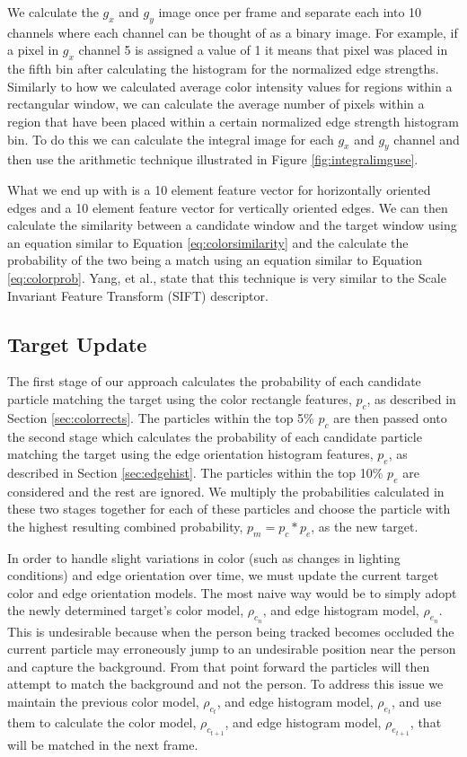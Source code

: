 \documentclass[11pt]{article}
\begin{document}
We calculate the $g_x$ and $g_y$ image once per frame and separate each into 10 channels where each channel can be thought of as a binary image. For example, if a pixel in $g_x$ channel 5 is assigned a value of 1 it means that pixel was placed in the fifth bin after calculating the histogram for the normalized edge strengths. Similarly to how we calculated average color intensity values for regions within a rectangular window, we can calculate the average number of pixels within a region that have been placed within a certain normalized edge strength histogram bin. To do this we can calculate the integral image for each $g_x$ and $g_y$ channel and then use the arithmetic technique illustrated in Figure \ref{fig:integralimguse}. 

What we end up with is a 10 element feature vector for horizontally oriented edges and a 10 element feature vector for vertically oriented edges. We can then calculate the similarity between a candidate window and the target window using an equation similar to Equation \ref{eq:colorsimilarity} and the calculate the probability of the two being a match using an equation similar to Equation \ref{eq:colorprob}. Yang, et al., state that this technique is very similar to the Scale Invariant Feature Transform (SIFT) descriptor.


\subsection{Target Update}

The first stage of our approach calculates the probability of each candidate particle matching the target using the color rectangle features, $p_c$, as described in Section \ref{sec:colorrects}. The particles within the top 5\% $p_c$ are then passed onto the second stage which calculates the probability of each candidate particle matching the target using the edge orientation histogram features, $p_e$, as described in Section \ref{sec:edgehist}. The particles within the top 10\% $p_e$ are considered and the rest are ignored. We multiply the probabilities calculated in these two stages together for each of these particles and choose the particle with the highest resulting combined probability, $p_m = p_c * p_e$, as the new target.

In order to handle slight variations in color (such as changes in lighting conditions) and edge orientation over time, we must update the current target color and edge orientation models. The most naive way would be to simply adopt the newly determined target's color model, $\rho_{c_{n}}$, and edge histogram model, $\rho_{e_{n}}$. This is undesirable because when the person being tracked becomes occluded the current particle may erroneously jump to an undesirable position near the person and capture the background. From that point forward the particles will then attempt to match the background and not the person. To address this issue we maintain the previous color model, $\rho_{c_{t}}$, and edge histogram model, $\rho_{e_{t}}$, and use them to calculate the color model, $\rho_{c_{t+1}}$, and edge histogram model, $\rho_{e_{t+1}}$, that will be matched in the next frame.
\end{document}
